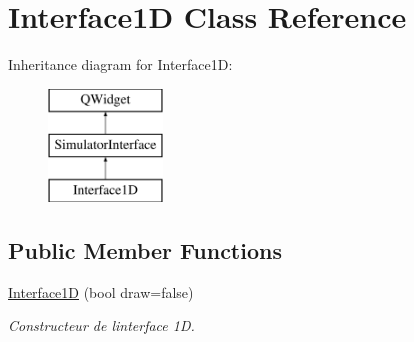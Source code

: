 \hypertarget{class_interface1_d}{}\section{Interface1D Class Reference}
\label{class_interface1_d}
Inheritance diagram for Interface1D\+:\begin{figure}[H]
\begin{center}
\leavevmode
\includegraphics[height=3.000000cm]{class_interface1_d}
\end{center}
\end{figure}
\subsection*{Public Member Functions}
\begin{DoxyCompactItemize}
\item 
\mbox{\hyperlink{class_interface1_d_a896f89a887e9b880679ded91a5782ac1}{Interface1D}} (bool draw=false)
\begin{DoxyCompactList}\small\item\em Constructeur de l\textquotesingle{}interface 1D. \end{DoxyCompactList}\end{DoxyCompactItemize}
